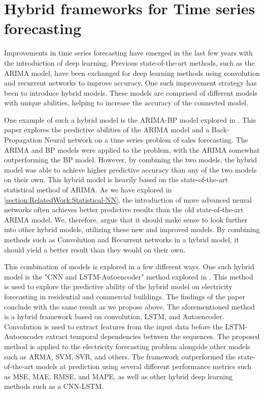 
\section{Hybrid frameworks for Time series forecasting}
\label{section:RelatedWork:Hybrid}

Improvements in time series forecasting have emerged in the last few years with the introduction of deep learning.
Previous state-of-the-art methods, such as the ARIMA model, have been exchanged for deep learning methods using convolution and recurrent networks to improve accuracy.
One such improvement strategy has been to introduce hybrid models.
These models are comprised of different models with unique abilities, helping to increase the accuracy of the connected model.


One example of such a hybrid model is the ARIMA-BP model explored in \cite{Bowen2020}.
This paper explores the predictive abilities of the ARIMA model and a Back-Propagation Neural network on a time series problem of sales forecasting.
The ARIMA and BP models were applied to the problem, with the ARIMA somewhat outperforming the BP model.
However, by combining the two models, the hybrid model was able to achieve higher predictive accuracy than any of the two models on their own.
This hybrid model is heavily based on the state-of-the-art statistical method of ARIMA.
As we have explored in \ref{section:RelatedWork:Statistical-NN}, the introduction of more advanced neural networks often achieves better predictive results than the old state-of-the-art ARIMA model.
We, therefore, argue that it should make sense to look further into other hybrid models, utilizing these new and improved models.
By combining methods such as Convolution and Recurrent networks in a hybrid model, it should yield a better result than they would on their own.


This combination of models is explored in a few different ways.
One such hybrid model is the "CNN and LSTM-Autoencoder" method explored in \cite{Khan2020}.
This method is used to explore the predictive ability of the hybrid model on electricity forecasting in residential and commercial buildings.
The findings of the paper conclude with the same result as we propose above.
The aforementioned method is a hybrid framework based on convolution, LSTM, and Autoencoder.
Convolution is used to extract features from the input data before the LSTM-Autoencoder extract temporal dependencies between the sequences.
The proposed method is applied to the electricity forecasting problem alongside other models such as ARMA, SVM, SVR, and others.
The framework outperformed the state-of-the-art models at prediction using several different performance metrics such as MSE, MAE, RMSE, and MAPE,
as well as other hybrid deep learning methods such as a CNN-LSTM.


